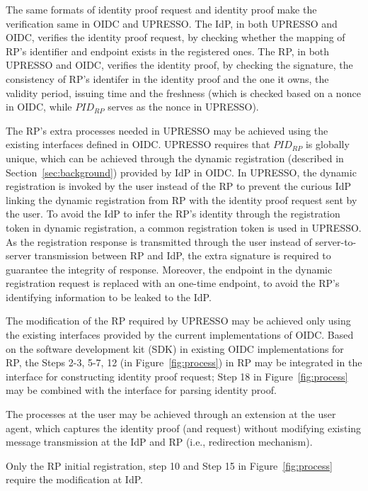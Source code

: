 The same formats of identity proof request and identity proof make the verification same in OIDC and UPRESSO. The IdP, in both UPRESSO and OIDC, verifies the identity proof request, by checking whether the mapping of RP's identifier and endpoint exists in the registered ones. The RP, in both UPRESSO and OIDC, verifies the identity proof, by checking the signature, the consistency of RP's identifer in the identity proof and the one it owns, the validity period, issuing time and the freshness (which is checked based on a nonce in  OIDC, while  $PID_{RP}$ serves as the nonce in UPRESSO).

The RP's extra processes needed in UPRESSO may be achieved using the existing interfaces defined in OIDC.
UPRESSO requires that $PID_{RP}$ is globally unique, which can be achieved through the dynamic registration (described in Section~\ref{sec:background}) provided by IdP in OIDC.
In UPRESSO, the dynamic registration is invoked by the user instead of the RP to prevent the curious IdP linking  the dynamic registration from RP with the identity proof request sent by the user.
To avoid the IdP to infer the RP's identity through the registration token in dynamic registration,
a common  registration token is used in UPRESSO.
As the registration response is transmitted through the user instead of server-to-server transmission between RP and IdP, the extra signature is required to guarantee the integrity of response. Moreover, the endpoint in the dynamic registration request is replaced with an one-time endpoint, to avoid the RP's identifying information to be leaked to the IdP.


The modification of the RP required by UPRESSO may be achieved only using the existing interfaces provided by the current implementations of OIDC.
Based on the software development kit (SDK) in existing OIDC implementations for RP, the Steps 2-3, 5-7, 12 (in Figure~\ref{fig:process}) in RP may be integrated in the interface for constructing identity proof request;
Step 18 in Figure~\ref{fig:process} may be combined with the interface for  parsing identity proof.

The processes at the user may be achieved through an extension at the user agent,
which captures the identity proof (and request)  without modifying existing message transmission at the IdP and RP (i.e., redirection mechanism). %


Only the RP initial registration, step 10 and Step 15 in Figure~\ref{fig:process} require the modification at IdP.

